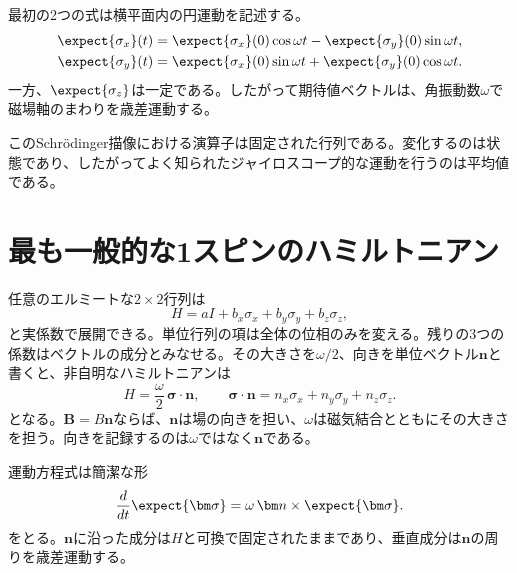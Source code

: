 最初の2つの式は横平面内の円運動を記述する。
\begin{align}
\expect{\sigma_x}(t)
&=\expect{\sigma_x}(0)\cos\omega t
-\expect{\sigma_y}(0)\sin\omega t,\\
\expect{\sigma_y}(t)
&=\expect{\sigma_x}(0)\sin\omega t
+\expect{\sigma_y}(0)\cos\omega t.
\end{align}
一方、\(\expect{\sigma_z}\)は一定である。したがって期待値ベクトルは、角振動数\(\omega\)で磁場軸のまわりを歳差運動する。

このSchr\"odinger描像における演算子は固定された行列である。変化するのは状態であり、したがってよく知られたジャイロスコープ的な運動を行うのは平均値である。

\begin{classroomqa}
\end{classroomqa}

\section{最も一般的な1スピンのハミルトニアン}

任意のエルミートな\(2\times2\)行列は
\begin{equation}
H=aI+b_x\sigma_x+b_y\sigma_y+b_z\sigma_z,
\end{equation}
と実係数で展開できる。単位行列の項は全体の位相のみを変える。残りの3つの係数はベクトルの成分とみなせる。その大きさを\(\omega/2\)、向きを単位ベクトル\(\bm n\)と書くと、非自明なハミルトニアンは
\begin{equation}
H=\frac{\omega}{2}\,\bm\sigma\cdot\bm n,
\qquad
\bm\sigma\cdot\bm n
=n_x\sigma_x+n_y\sigma_y+n_z\sigma_z.
\label{eq:l5-general-spin-h}
\end{equation}
となる。\(\bm B=B\bm n\)ならば、\(\bm n\)は場の向きを担い、\(\omega\)は磁気結合とともにその大きさを担う。向きを記録するのは\(\omega\)ではなく\(\bm n\)である。

運動方程式は簡潔な形
\begin{equation}
\frac{d}{dt}\expect{\bm\sigma}
=\omega\,\bm n\times\expect{\bm\sigma}.
\end{equation}
をとる。\(\bm n\)に沿った成分は\(H\)と可換で固定されたままであり、垂直成分は\(\bm n\)の周りを歳差運動する。

